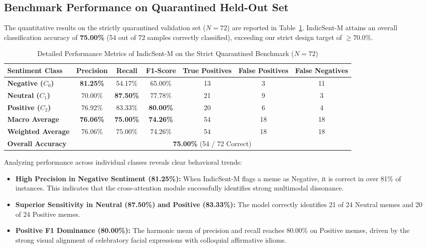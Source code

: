 \documentclass[10pt,journal,compsoc]{IEEEtran}
\begin{document}
\subsection{Benchmark Performance on Quarantined Held-Out Set}
The quantitative results on the strictly quarantined validation set ($N=72$) are reported in Table~\ref{tab:held_out_metrics}. IndicSent-M attains an overall classification accuracy of \textbf{75.00\%} (54 out of 72 samples correctly classified), exceeding our strict design target of $\ge 70.0\%$.

\begin{table}[!t]
\centering
\caption{Detailed Performance Metrics of IndicSent-M on the Strict Quarantined Benchmark ($N=72$)}
\label{tab:held_out_metrics}
\begin{tabular}{lcccccc}
\toprule
\textbf{Sentiment Class} & \textbf{Precision} & \textbf{Recall} & \textbf{F1-Score} & \textbf{True Positives} & \textbf{False Positives} & \textbf{False Negatives} \\
\midrule
\textbf{Negative ($C_0$)} & \textbf{81.25\%} & 54.17\% & 65.00\% & 13 & 3 & 11 \\
\textbf{Neutral ($C_1$)}  & 70.00\% & \textbf{87.50\%} & 77.78\% & 21 & 9 & 3 \\
\textbf{Positive ($C_2$)} & 76.92\% & 83.33\% & \textbf{80.00\%} & 20 & 6 & 4 \\
\midrule
\textbf{Macro Average}    & \textbf{76.06\%} & \textbf{75.00\%} & \textbf{74.26\%} & 54 & 18 & 18 \\
\textbf{Weighted Average} & 76.06\% & 75.00\% & 74.26\% & 54 & 18 & 18 \\
\textbf{Overall Accuracy} & \multicolumn{6}{c}{\textbf{75.00\%} (54 / 72 Correct)} \\
\bottomrule
\end{tabular}
\end{table}

Analyzing performance across individual classes reveals clear behavioral trends:
\begin{itemize}
    \item \textbf{High Precision in Negative Sentiment (81.25\%):} When IndicSent-M flags a meme as Negative, it is correct in over 81\% of instances. This indicates that the cross-attention module successfully identifies strong multimodal dissonance.
    \item \textbf{Superior Sensitivity in Neutral (87.50\%) and Positive (83.33\%):} The model correctly identifies 21 of 24 Neutral memes and 20 of 24 Positive memes.
    \item \textbf{Positive F1 Dominance (80.00\%):} The harmonic mean of precision and recall reaches 80.00\% on Positive memes, driven by the strong visual alignment of celebratory facial expressions with colloquial affirmative idioms.
\end{itemize}
\end{document}
